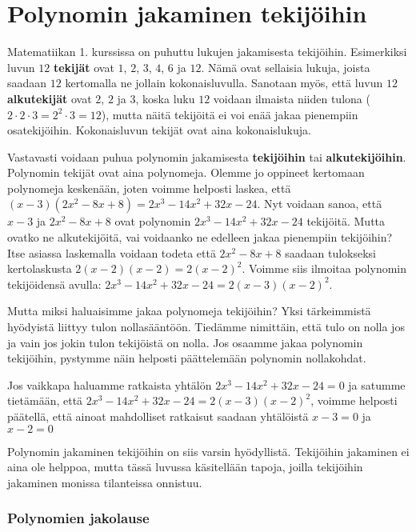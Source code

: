\chapter{Polynomin jakaminen tekijöihin}

Matematiikan 1. kurssissa on puhuttu lukujen jakamisesta tekijöihin.
Esimerkiksi luvun $12$ {\bf tekijät} ovat $1$, $2$, $3$, $4$, $6$ ja $12$. Nämä ovat sellaisia
lukuja, joista saadaan $12$ kertomalla ne jollain kokonaisluvulla. Sanotaan myös, että luvun $12$
{\bf alkutekijät} ovat $2$, $2$ ja $3$, koska luku $12$ voidaan
ilmaista niiden tulona ($2\cdot 2\cdot 3 = 2^2\cdot 3 = 12$), mutta näitä tekijöitä ei
voi enää jakaa pienempiin osatekijöihin. Kokonaisluvun tekijät ovat aina kokonaislukuja.

Vastavasti voidaan puhua polynomin jakamisesta {\bf tekijöihin} tai {\bf alkutekijöihin}. Polynomin tekijät
ovat aina polynomeja. Olemme jo oppineet kertomaan polynomeja keskenään,
joten voimme helposti laskea, että $(x-3)(2x^2-8x+8)=2x^3-14x^2+32x-24$.
Nyt voidaan sanoa, että $x-3$ ja $2x^2-8x+8$ ovat polynomin $2x^3-14x^2+32x-24$ tekijöitä.
Mutta ovatko ne alkutekijöitä, vai voidaanko ne edelleen jakaa pienempiin tekijöihin?
Itse asiassa laskemalla voidaan todeta että $2x^2-8x+8$ saadaan tulokseksi kertolaskusta $2(x-2)(x-2)=2(x-2)^2$.
Voimme siis ilmoitaa polynomin tekijöidensä avulla: $2x^3-14x^2+32x-24=2(x-3)(x-2)^2$.

Mutta miksi haluaisimme jakaa polynomeja tekijöihin?
Yksi tärkeimmistä hyödyistä liittyy tulon nollasääntöön. Tiedämme nimittäin, että tulo on nolla jos ja vain jos
jokin tulon tekijöistä on nolla. Jos osaamme jakaa polynomin tekijöihin, pystymme näin helposti päättelemään polynomin nollakohdat.

Jos vaikkapa haluamme ratkaista yhtälön $2x^3-14x^2+32x-24=0$ ja satumme tietämään, että $2x^3-14x^2+32x-24=2(x-3)(x-2)^2$,
voimme helposti päätellä, että ainoat mahdolliset ratkaisut saadaan yhtälöistä $x-3=0$ ja $x-2=0$


Polynomin jakaminen tekijöihin on siis varsin hyödyllistä. Tekijöihin jakaminen ei aina ole helppoa,
mutta tässä luvussa käsitellään tapoja, joilla tekijöihin jakaminen monissa tilanteissa onnistuu.

\subsection*{Polynomien jakolause}

